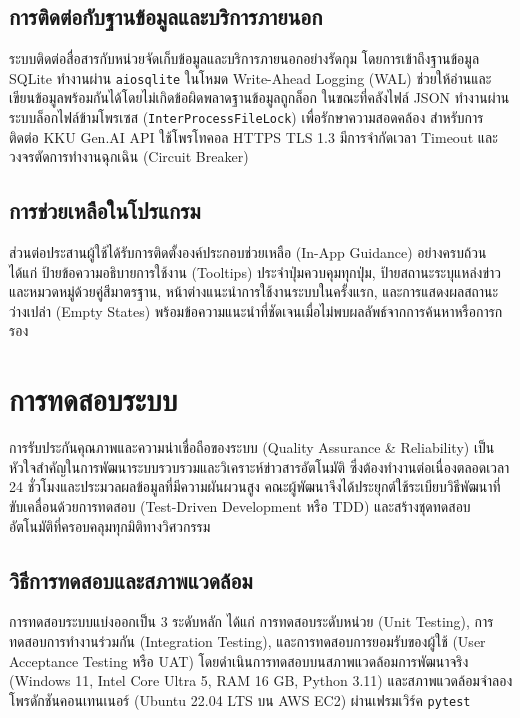 \subsection{การติดต่อกับฐานข้อมูลและบริการภายนอก}

ระบบติดต่อสื่อสารกับหน่วยจัดเก็บข้อมูลและบริการภายนอกอย่างรัดกุม โดยการเข้าถึงฐานข้อมูล SQLite ทำงานผ่าน \texttt{aiosqlite} ในโหมด Write-Ahead Logging (WAL) ช่วยให้อ่านและเขียนข้อมูลพร้อมกันได้โดยไม่เกิดข้อผิดพลาดฐานข้อมูลถูกล็อก ในขณะที่คลังไฟล์ JSON ทำงานผ่านระบบล็อกไฟล์ข้ามโพรเซส (\texttt{InterProcessFileLock}) เพื่อรักษาความสอดคล้อง สำหรับการติดต่อ KKU Gen.AI API ใช้โพรโทคอล HTTPS TLS 1.3 มีการจำกัดเวลา Timeout และวงจรตัดการทำงานฉุกเฉิน (Circuit Breaker)

\subsection{การช่วยเหลือในโปรแกรม}

ส่วนต่อประสานผู้ใช้ได้รับการติดตั้งองค์ประกอบช่วยเหลือ (In-App Guidance) อย่างครบถ้วน ได้แก่ ป้ายข้อความอธิบายการใช้งาน (Tooltips) ประจำปุ่มควบคุมทุกปุ่ม, ป้ายสถานะระบุแหล่งข่าวและหมวดหมู่ด้วยคู่สีมาตรฐาน, หน้าต่างแนะนำการใช้งานระบบในครั้งแรก, และการแสดงผลสถานะว่างเปล่า (Empty States) พร้อมข้อความแนะนำที่ชัดเจนเมื่อไม่พบผลลัพธ์จากการค้นหาหรือการกรอง

\section{การทดสอบระบบ}

การรับประกันคุณภาพและความน่าเชื่อถือของระบบ (Quality Assurance \& Reliability) เป็นหัวใจสำคัญในการพัฒนาระบบรวบรวมและวิเคราะห์ข่าวสารอัตโนมัติ ซึ่งต้องทำงานต่อเนื่องตลอดเวลา 24 ชั่วโมงและประมวลผลข้อมูลที่มีความผันผวนสูง คณะผู้พัฒนาจึงได้ประยุกต์ใช้ระเบียบวิธีพัฒนาที่ขับเคลื่อนด้วยการทดสอบ (Test-Driven Development หรือ TDD) และสร้างชุดทดสอบอัตโนมัติที่ครอบคลุมทุกมิติทางวิศวกรรม

\subsection{วิธีการทดสอบและสภาพแวดล้อม}

การทดสอบระบบแบ่งออกเป็น 3 ระดับหลัก ได้แก่ การทดสอบระดับหน่วย (Unit Testing), การทดสอบการทำงานร่วมกัน (Integration Testing), และการทดสอบการยอมรับของผู้ใช้ (User Acceptance Testing หรือ UAT) โดยดำเนินการทดสอบบนสภาพแวดล้อมการพัฒนาจริง (Windows 11, Intel Core Ultra 5, RAM 16 GB, Python 3.11) และสภาพแวดล้อมจำลองโพรดักชันคอนเทนเนอร์ (Ubuntu 22.04 LTS บน AWS EC2) ผ่านเฟรมเวิร์ค \texttt{pytest}

